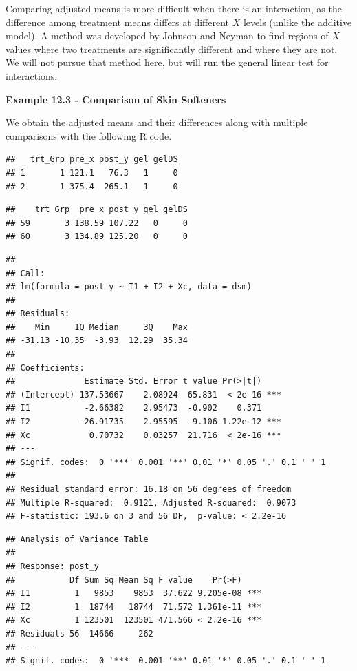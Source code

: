 \documentclass[
]{book}
\begin{document}
Comparing adjusted means is more difficult when there is an interaction,
as the difference among treatment means differs at different \(X\)
levels (unlike the additive model). A method was developed by Johnson
and Neyman to find regions of \(X\) values where two treatments are
significantly different and where they are not. We will not pursue that
method here, but will run the general linear test for interactions.

\textbf{Example 12.3 - Comparison of Skin Softeners}

We obtain the adjusted means and their differences along with multiple
comparisons with the following R code.

\begin{verbatim}
##   trt_Grp pre_x post_y gel gelDS
## 1       1 121.1   76.3   1     0
## 2       1 375.4  265.1   1     0
\end{verbatim}

\begin{verbatim}
##    trt_Grp  pre_x post_y gel gelDS
## 59       3 138.59 107.22   0     0
## 60       3 134.89 125.20   0     0
\end{verbatim}

\begin{verbatim}
## 
## Call:
## lm(formula = post_y ~ I1 + I2 + Xc, data = dsm)
## 
## Residuals:
##    Min     1Q Median     3Q    Max 
## -31.13 -10.35  -3.93  12.29  35.34 
## 
## Coefficients:
##              Estimate Std. Error t value Pr(>|t|)    
## (Intercept) 137.53667    2.08924  65.831  < 2e-16 ***
## I1           -2.66382    2.95473  -0.902    0.371    
## I2          -26.91735    2.95595  -9.106 1.22e-12 ***
## Xc            0.70732    0.03257  21.716  < 2e-16 ***
## ---
## Signif. codes:  0 '***' 0.001 '**' 0.01 '*' 0.05 '.' 0.1 ' ' 1
## 
## Residual standard error: 16.18 on 56 degrees of freedom
## Multiple R-squared:  0.9121, Adjusted R-squared:  0.9073 
## F-statistic: 193.6 on 3 and 56 DF,  p-value: < 2.2e-16
\end{verbatim}

\begin{verbatim}
## Analysis of Variance Table
## 
## Response: post_y
##           Df Sum Sq Mean Sq F value    Pr(>F)    
## I1         1   9853    9853  37.622 9.205e-08 ***
## I2         1  18744   18744  71.572 1.361e-11 ***
## Xc         1 123501  123501 471.566 < 2.2e-16 ***
## Residuals 56  14666     262                      
## ---
## Signif. codes:  0 '***' 0.001 '**' 0.01 '*' 0.05 '.' 0.1 ' ' 1
\end{verbatim}
\end{document}
